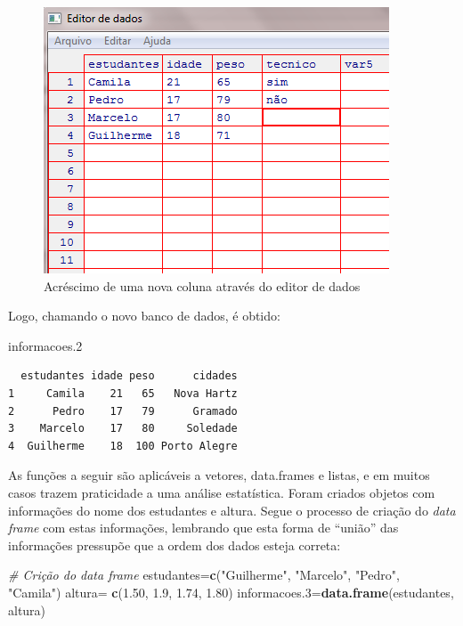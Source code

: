 \documentclass[12pt,brazil,oneside]{book}
\newenvironment{Shaded}{\begin{snugshade}}{\end{snugshade}}
\newcommand{\CommentTok}[1]{\textcolor[rgb]{0.56,0.35,0.01}{\textit{#1}}}
\newcommand{\FloatTok}[1]{\textcolor[rgb]{0.00,0.00,0.81}{#1}}
\newcommand{\KeywordTok}[1]{\textcolor[rgb]{0.13,0.29,0.53}{\textbf{#1}}}
\newcommand{\NormalTok}[1]{#1}
\newcommand{\StringTok}[1]{\textcolor[rgb]{0.31,0.60,0.02}{#1}}
\begin{document}
\begin{figure}[H]

{\centering \includegraphics[width=0.7\linewidth]{10} 

}

\caption{Acréscimo de uma nova coluna através do editor de dados}\label{fig:10}
\end{figure}

Logo, chamando o novo banco de dados, é obtido:

\begin{Shaded}
\begin{Highlighting}[]
\NormalTok{informacoes}\FloatTok{.2} 
\end{Highlighting}
\end{Shaded}

\begin{verbatim}
  estudantes idade peso      cidades
1     Camila    21   65   Nova Hartz
2      Pedro    17   79      Gramado
3    Marcelo    17   80     Soledade
4  Guilherme    18  100 Porto Alegre
\end{verbatim}

As funções a seguir são aplicáveis a vetores, data.frames e listas, e em muitos casos trazem praticidade a uma análise estatística. Foram criados objetos com informações do nome dos estudantes e altura. Segue o processo de criação do \emph{data frame} com estas informações, lembrando que esta forma de ``união'' das informações pressupõe que a ordem dos dados esteja correta:

\begin{Shaded}
\begin{Highlighting}[]
\CommentTok{# Crição do data frame}
\NormalTok{estudantes=}\KeywordTok{c}\NormalTok{(}\StringTok{"Guilherme"}\NormalTok{, }\StringTok{"Marcelo"}\NormalTok{, }\StringTok{"Pedro"}\NormalTok{, }\StringTok{"Camila"}\NormalTok{)}
\NormalTok{altura=}\StringTok{ }\KeywordTok{c}\NormalTok{(}\FloatTok{1.50}\NormalTok{, }\FloatTok{1.9}\NormalTok{, }\FloatTok{1.74}\NormalTok{, }\FloatTok{1.80}\NormalTok{)}
\NormalTok{informacoes}\FloatTok{.3}\NormalTok{=}\KeywordTok{data.frame}\NormalTok{(estudantes, altura)}
\end{Highlighting}
\end{Shaded}
\end{document}
